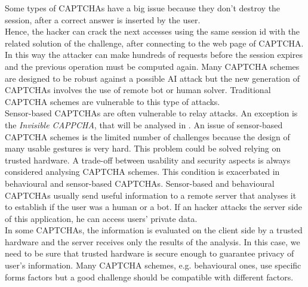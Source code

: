 \begin{itemize}
{Some types of CAPTCHAs have a big issue because they don't destroy the session, after a correct answer is inserted by the user\cite{text_audio}.\\
Hence, the hacker can crack the next accesses using the same session id with the related solution of the challenge, after connecting to the web page of CAPTCHA. In this way the attacker can make hundreds of requests before the session expires and the previous operation must be computed again.}
{Many CAPTCHA schemes are designed to be robust against a possible AI attack but the new generation of CAPTCHAs involves the use of remote bot or human solver. Traditional CAPTCHA schemes are vulnerable to this type of attacks.\\
Sensor-based CAPTCHAs are often vulnerable to relay attacks. An exception is the \textit{Invisible CAPPCHA}, that will be analysed in .
}
{An issue of sensor-based CAPTCHA schemes is the limited number of challenges because the design of many usable gestures is very hard. This problem could be solved
relying on trusted hardware.}
{A trade-off between usability and security aspects is always considered analysing CAPTCHA schemes. This condition is exacerbated in behavioural and sensor-based CAPTCHAs.}
{Sensor-based and behavioural CAPTCHAs usually send useful information to a remote server that analyses it to establish if the user was a human or a bot. If an hacker attacks the server side of this application, he can access users' private data.\\
In some CAPTCHAs, the information is evaluated on the client side by a trusted hardware and the server receives only the results of the analysis. In this case, we need to be sure that trusted hardware is secure enough to guarantee privacy of user's information.
}
{Many CAPTCHA schemes, e.g. behavioural ones, use specific forms factors but a good challenge should be compatible with different factors.}
\end{itemize}

